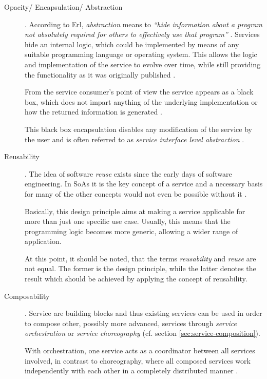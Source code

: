 \begin{description}
\item [Opacity/ Encapsulation/ Abstraction] .
According to Erl, \emph{abstraction} means to \emph{``hide information about a program not absolutely required for others to effectively use that program''} \cite[ch.8.1.]{erl2008}.
Services hide an internal logic, which could be implemented by means of any suitable programming language or operating system. This allows the logic and implementation of the service to evolve over time, while still providing the functionality as it was originally published \cite[ch.8.1]{erl2008}.

From the service consumer's point of view the service appears as a black box, which does not impart anything of the underlying implementation or how the returned information is generated \cite{opengroup} \cite{breivold} \cite{arrowhead} \cite[p.27]{erl2011}.

This black box encapsulation disables any modification of the service by the user and is often referred to as \emph{service interface level abstraction} \cite{breivold}.

\item [Reusability].
The idea of software \emph{reuse} exists since the early days of software engineering. In SoAs it is the key concept of a service and a necessary basis for many of the other concepts would not even be possible without it \cite[ch.9.1.]{erl2008} \cite[p.27]{erl2011}.

Basically, this design principle aims at making a service applicable for more than just one specific use case. Usually, this means that the programming logic becomes more generic, allowing a wider range of application.

At this point, it should be noted, that the terms \emph{reusability} and \emph{reuse} are not equal. The former is the design principle, while the latter denotes the result which should be achieved by applying the concept of reusability.

\item [Composability]. 
Service are building blocks and thus existing services can be used in order to compose other, possibly more advanced, services through \emph{service orchestration} or \emph{service choreography} (cf. section \ref{sec:service-composition}). 

With orchestration, one service acts as a coordinator between all services involved, in contrast to choreography, where all composed services work independently with each other in a completely distributed manner \cite{opengroup} \cite{arrowhead} \cite{breivold} \cite[p.27]{erl2011}.


\end{description}
